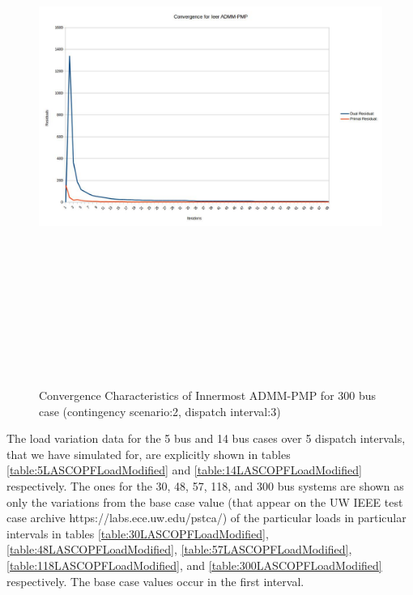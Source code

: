 \documentclass[preprint,12pt,3p]{elsarticle}
\begin{document}
	\begin{figure}
		\begin{center}
			\includegraphics[height=17.5cm,width=21cm, angle=90]{300bus_2Scen_3Int.jpg} %
			\caption{Convergence Characteristics of Innermost ADMM-PMP for 300 bus case (contingency scenario:2, dispatch interval:3)}
			\label{ADMM-PMP300}
		\end{center}
	\end{figure}
	The load variation data for the 5 bus and 14 bus cases over 5 dispatch intervals, that we have simulated for, are explicitly shown in tables \ref{table:5LASCOPFLoadModified} and \ref{table:14LASCOPFLoadModified} respectively. The ones for the 30, 48, 57, 118, and 300 bus systems are shown as only the variations from the base case value (that appear on the UW IEEE test case archive https://labs.ece.uw.edu/pstca/) of the particular loads in particular intervals in tables \ref{table:30LASCOPFLoadModified}, \ref{table:48LASCOPFLoadModified}, \ref{table:57LASCOPFLoadModified}, \ref{table:118LASCOPFLoadModified}, and \ref{table:300LASCOPFLoadModified} respectively. The base case values occur in the first interval.
\end{document}
